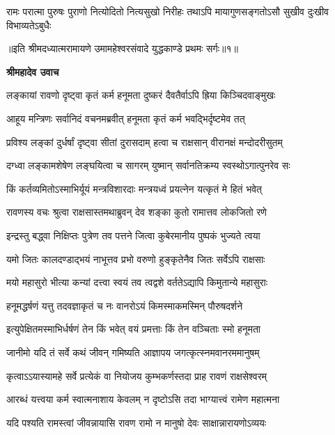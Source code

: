 \fourlineindentedshloka
{रामः परात्मा पुरुषः पुराणो}
{नित्योदितो नित्यसुखो निरीहः}
{तथाऽपि मायागुणसङ्गतोऽसौ}
{सुखीव दुःखीव विभाव्यतेऽबुधैः} %

{॥इति श्रीमदध्यात्मरामायणे उमामहेश्वरसंवादे युद्धकाण्डे
प्रथमः सर्गः॥१॥
}




\textbf{श्रीमहादेव उवाच}

\twolineshloka
{लङ्कायां रावणो दृष्ट्वा कृतं कर्म हनूमता}
{दुष्करं दैवतैर्वाऽपि ह्रिया किञ्चिदवाङ्मुखः} %

\twolineshloka
{आहूय मन्त्रिणः सर्वानिदं वचनमब्रवीत्}
{हनूमता कृतं कर्म भवद्भिर्दृष्टमेव तत्} %

\twolineshloka
{प्रविश्य लङ्कां दुर्धर्षां दृष्ट्वा सीतां दुरासदाम्}
{हत्वा च राक्षसान् वीरानक्षं मन्दोदरीसुतम्} %

\twolineshloka
{दग्ध्वा लङ्कामशेषेण लङ्घयित्वा च सागरम्}
{युष्मान् सर्वानतिक्रम्य स्वस्थोऽगात्पुनरेव सः} %

\twolineshloka
{किं कर्तव्यमितोऽस्माभिर्यूयं मन्त्रविशारदाः}
{मन्त्रयध्वं प्रयत्नेन यत्कृतं मे हितं भवेत्} %

\twolineshloka
{रावणस्य वचः श्रुत्वा राक्षसास्तमथाब्रुवन्}
{देव शङ्का कुतो रामात्तव लोकजितो रणे} %

\twolineshloka
{इन्द्रस्तु बद्ध्वा निक्षिप्तः पुत्रेण तव पत्तने}
{जित्वा कुबेरमानीय पुष्पकं भुज्यते त्वया} %

\twolineshloka
{यमो जितः कालदण्डाद्भयं नाभूत्तव प्रभो}
{वरुणो हुङ्कृतेनैव जितः सर्वेऽपि राक्षसाः} %

\twolineshloka
{मयो महासुरो भीत्या कन्यां दत्त्वा स्वयं तव}
{त्वद्वशे वर्ततेऽद्यापि किमुतान्ये महासुराः} %

\twolineshloka
{हनूमद्धर्षणं यत्तु तदवज्ञाकृतं च नः}
{वानरोऽयं किमस्माकमस्मिन् पौरुषदर्शने} %

\twolineshloka
{इत्युपेक्षितमस्माभिर्धर्षणं तेन किं भवेत्}
{वयं प्रमत्ताः किं तेन वञ्चिताः स्मो हनूमता} %

\twolineshloka
{जानीमो यदि तं सर्वे कथं जीवन् गमिष्यति}
{आज्ञापय जगत्कृत्स्नमवानरममानुषम्} %

\twolineshloka
{कृत्वाऽऽयास्यामहे सर्वे प्रत्येकं वा नियोजय}
{कुम्भकर्णस्तदा प्राह रावणं राक्षसेश्वरम्} %

\twolineshloka
{आरब्धं यत्त्वया कर्म स्वात्मनाशाय केवलम्}
{न दृष्टोऽसि तदा भाग्यात्त्वं रामेण महात्मना} %

\twolineshloka
{यदि पश्यति रामस्त्वां जीवन्नायासि रावण}
{रामो न मानुषो देवः साक्षान्नारायणोऽव्ययः} %

